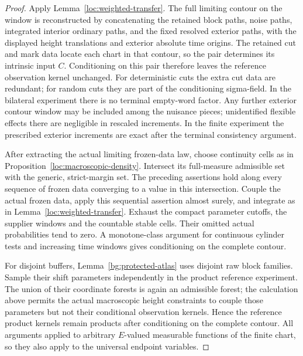 \begin{proof}
Apply Lemma~\ref{loc:weighted-transfer}.  The full limiting contour on
the window is reconstructed by concatenating the retained block paths,
noise paths, integrated interior ordinary paths, and the fixed resolved
exterior paths, with the displayed
height translations and exterior absolute time origins.  The retained
cut and mark data locate each chart in that contour, so the pair
determines its intrinsic input $C$.  Conditioning on this pair therefore
leaves the reference observation kernel unchanged.  For deterministic
cuts the extra cut data are redundant; for random cuts they are part of
the conditioning sigma-field.  In the bilateral experiment
there is no terminal empty-word factor.  Any further exterior contour
window may be included among the nuisance pieces; unidentified flexible
effects there are negligible in rescaled increments.  In the finite
experiment the prescribed exterior increments are exact after the
terminal consistency argument.

After extracting the actual limiting frozen-data law, choose continuity
cells as in Proposition~\ref{loc:macroscopic-density}.  Intersect its
full-measure admissible set with the generic, strict-margin set.  The
preceding assertions hold along every sequence of frozen data converging
to a value in this intersection.  Couple the actual frozen data, apply
this sequential assertion almost surely, and integrate as in
Lemma~\ref{loc:weighted-transfer}.  Exhaust the
compact parameter cutoffs, the supplier windows and the countable
stable cells.  Their omitted actual probabilities tend to zero.  A
monotone-class argument for continuous cylinder tests and increasing
time windows gives conditioning on the complete contour.

For disjoint buffers, Lemma~\ref{bg:protected-atlas} uses disjoint
raw block families.  Sample their shift parameters independently in the
product reference experiment.  The union of their coordinate forests is
again an admissible forest; the calculation above permits the actual
macroscopic height constraints to couple those parameters but not their
conditional observation kernels.  Hence the reference product kernels
remain products after conditioning on the complete contour.  All
arguments applied to arbitrary $E$-valued measurable functions of the
finite chart, so they also apply to the universal endpoint variables.
\end{proof}

